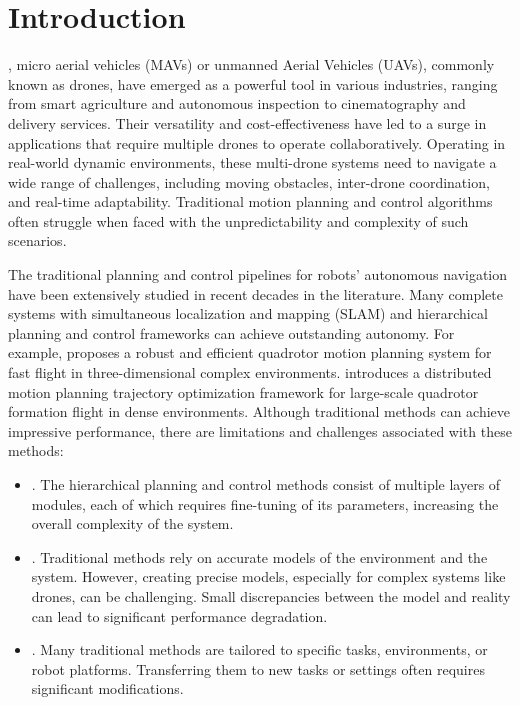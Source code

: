 \documentclass[letterpaper,journal,twoside]{IEEEtran}
\begin{document}
\section{Introduction}
, micro aerial vehicles (MAVs) or 
unmanned Aerial Vehicles (UAVs), commonly known as drones, 
have emerged as a powerful tool in various industries, 
ranging from 
smart agriculture and autonomous inspection
to cinematography and delivery 
services. 
Their versatility and cost-effectiveness have led to a 
surge in applications that require multiple drones to operate 
collaboratively. 
Operating in real-world dynamic environments, 
these multi-drone systems need to navigate a wide range of 
challenges, 
including moving obstacles, inter-drone coordination, and 
real-time adaptability. 
Traditional motion planning and control algorithms often  
struggle when faced with the unpredictability and complexity of such 
scenarios.

The traditional planning and control pipelines for robots' 
autonomous navigation have been extensively studied in recent
decades in the literature. 
Many complete systems with simultaneous localization 
and mapping (SLAM) and hierarchical 
planning and control frameworks can achieve outstanding 
autonomy.
For example, \cite{zhou2019robust} proposes a robust and efficient 
quadrotor motion planning system for fast flight in 
three-dimensional complex environments.
\cite{quan2023robust} introduces a distributed motion planning 
trajectory optimization framework for large-scale quadrotor 
formation flight in dense environments.
Although traditional methods can achieve impressive performance, 
there are limitations and challenges associated with these methods: 
\begin{itemize}
  \item {}. The hierarchical planning and control 
  methods consist of multiple layers of modules,   
  each of which requires fine-tuning of 
  its parameters, increasing the overall complexity of the system.
  \item {}. Traditional methods rely on 
  accurate models of the environment and the system. However, 
  creating precise models, especially for complex systems like 
  drones, can be challenging. Small discrepancies between the 
  model and reality can lead to significant performance 
  degradation. 
  \item {}. Many traditional methods are 
  tailored to specific tasks, environments, 
  or robot platforms. Transferring them 
  to new tasks or settings often requires significant 
  modifications. 
\end{itemize}
\end{document}
